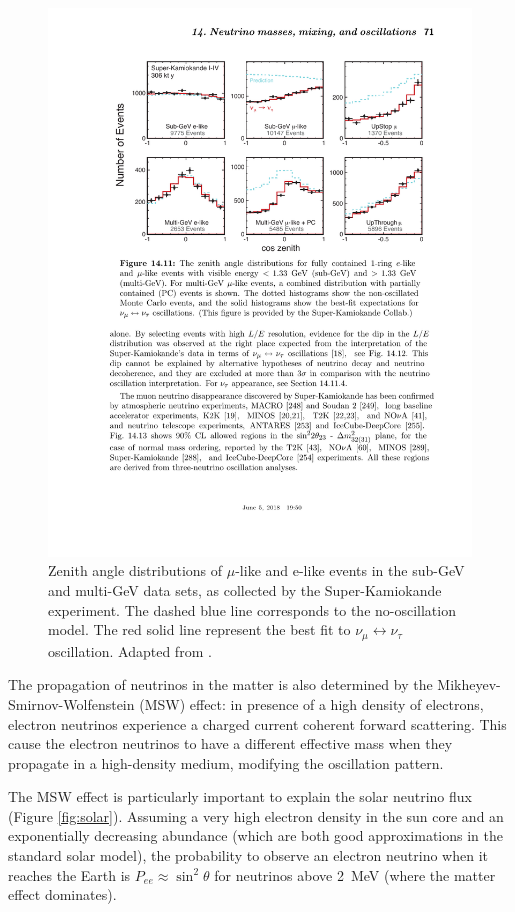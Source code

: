 \begin{figure}[htbp]
    \centering
    \includegraphics[width=0.9\linewidth]{figures/superk.pdf}
    \caption{Zenith angle distributions of $\mu$-like and e-like events in the sub-GeV and multi-GeV data sets, as collected by the Super-Kamiokande experiment. The dashed blue line corresponds to the no-oscillation model. The red solid line represent the best fit to $\nu_{\mu} \leftrightarrow \nu_{\tau}$ oscillation. Adapted from \cite{PhysRevD.98.030001}.}
    \label{fig:superk}
\end{figure}

The propagation of neutrinos in the matter is also determined by the Mikheyev-Smirnov-Wolfenstein (MSW) effect: in presence of a high density of electrons, electron neutrinos experience a charged current coherent forward scattering. This cause the electron neutrinos to have a different effective mass when they propagate in a high-density medium, modifying the oscillation pattern. 

The MSW effect is particularly important to explain the solar neutrino flux (Figure \ref{fig:solar}). Assuming a very high electron density in the sun core and an exponentially decreasing abundance (which are both good approximations in the standard solar model), the probability to observe an electron neutrino when it reaches the Earth is $P_{ee} \approx \sin^2\theta$ for neutrinos above 2~MeV (where the matter effect dominates).

